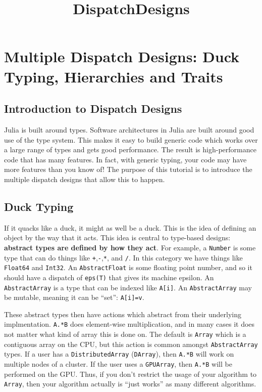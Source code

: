 \documentclass[11pt]{article}
\title{DispatchDesigns}
\begin{document}
    
    
    \maketitle
    
    

    
    \section{Multiple Dispatch Designs: Duck Typing, Hierarchies and
Traits}\label{multiple-dispatch-designs-duck-typing-hierarchies-and-traits}

\subsection{Introduction to Dispatch
Designs}\label{introduction-to-dispatch-designs}

Julia is built around types. Software architectures in Julia are built
around good use of the type system. This makes it easy to build generic
code which works over a large range of types and gets good performance.
The result is high-performance code that has many features. In fact,
with generic typing, your code may have more features than you know of!
The purpose of this tutorial is to introduce the multiple dispatch
designs that allow this to happen.

    \subsection{Duck Typing}\label{duck-typing}

If it quacks like a duck, it might as well be a duck. This is the idea
of defining an object by the way that it acts. This idea is central to
type-based designs: \textbf{abstract types are defined by how they act}.
For example, a \texttt{Number} is some type that can do things like
\texttt{+},\texttt{-},\texttt{*}, and \texttt{/}. In this category we
have things like \texttt{Float64} and \texttt{Int32}. An
\texttt{AbstractFloat} is some floating point number, and so it should
have a dispatch of \texttt{eps(T)} that gives its machine epsilon. An
\texttt{AbstractArray} is a type that can be indexed like
\texttt{A{[}i{]}}. An \texttt{AbstractArray} may be mutable, meaning it
can be ``set'': \texttt{A{[}i{]}=v}.

These abstract types then have actions which abstract from their
underlying implmentation. \texttt{A.*B} does element-wise
multiplication, and in many cases it does not matter what kind of array
this is done on. The default is \texttt{Array} which is a contiguous
array on the CPU, but this action is common amongst
\texttt{AbstractArray} types. If a user has a \texttt{DistributedArray}
(\texttt{DArray}), then \texttt{A.*B} will work on multiple nodes of a
cluster. If the user uses a \texttt{GPUArray}, then \texttt{A.*B} will
be performed on the GPU. Thus, if you don't restrict the usage of your
algorithm to \texttt{Array}, then your algorithm actually is ``just
works'' as many different algorithms.
\end{document}
